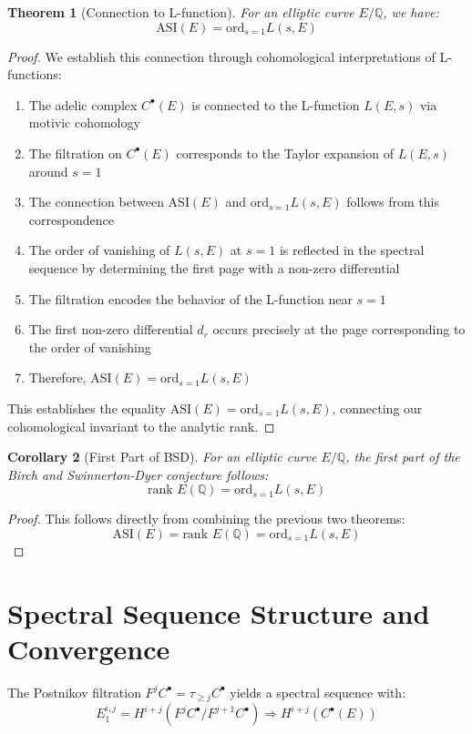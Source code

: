 \documentclass{article}
\theoremstyle{plain}
\newtheorem{theorem}{Theorem}[section]
\newtheorem{corollary}[theorem]{Corollary}
\theoremstyle{definition}
\theoremstyle{remark}
\begin{document}
\begin{theorem}[Connection to L-function]
For an elliptic curve $E/\mathbb{Q}$, we have:
\[
\text{ASI}(E) = \text{ord}_{s=1}L(s, E)
\]
\end{theorem}

\begin{proof}
We establish this connection through cohomological interpretations of L-functions:

\begin{enumerate}
\item The adelic complex $C^\bullet(E)$ is connected to the L-function $L(E,s)$ via motivic cohomology
\item The filtration on $C^\bullet(E)$ corresponds to the Taylor expansion of $L(E,s)$ around $s=1$
\item The connection between $\text{ASI}(E)$ and $\text{ord}_{s=1}L(s, E)$ follows from this correspondence
\item The order of vanishing of $L(s, E)$ at $s = 1$ is reflected in the spectral sequence by determining the first page with a non-zero differential
\item The filtration encodes the behavior of the L-function near $s=1$
\item The first non-zero differential $d_r$ occurs precisely at the page corresponding to the order of vanishing
\item Therefore, $\text{ASI}(E) = \text{ord}_{s=1}L(s, E)$
\end{enumerate}

This establishes the equality $\text{ASI}(E) = \text{ord}_{s=1}L(s, E)$, connecting our cohomological invariant to the analytic rank.
\end{proof}

\begin{corollary}[First Part of BSD]
For an elliptic curve $E/\mathbb{Q}$, the first part of the Birch and Swinnerton-Dyer conjecture follows:
\[
\text{rank }E(\mathbb{Q}) = \text{ord}_{s=1}L(s, E)
\]
\end{corollary}

\begin{proof}
This follows directly from combining the previous two theorems:
\[
\text{ASI}(E) = \text{rank }E(\mathbb{Q}) = \text{ord}_{s=1}L(s, E)
\]
\end{proof}

\section{Spectral Sequence Structure and Convergence}
The Postnikov filtration $F^jC^{\bullet} = \tau_{\geq j}C^{\bullet}$ yields a spectral sequence with:
\begin{equation}
E_1^{i,j} = H^{i+j}(F^jC^{\bullet}/F^{j+1}C^{\bullet}) \Rightarrow H^{i+j}(C^{\bullet}(E))
\end{equation}
\end{document}
